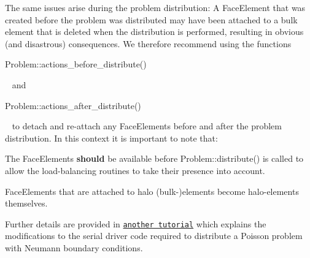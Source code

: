 The same issues arise during the problem distribution\+: A {\ttfamily Face\+Element} that was created before the problem was distributed may have been attached to a bulk element that is deleted when the distribution is performed, resulting in obvious (and disastrous) consequences. We therefore recommend using the functions ~\newline
~\newline

\begin{DoxyCode}
Problem::actions\_before\_distribute()
\end{DoxyCode}
 ~\newline
and ~\newline
~\newline

\begin{DoxyCode}
Problem::actions\_after\_distribute()
\end{DoxyCode}
 ~\newline
to detach and re-\/attach any {\ttfamily Face\+Elements} before and after the problem distribution. In this context it is important to note that\+: ~\newline

\begin{DoxyEnumerate}
\item The {\ttfamily Face\+Elements} {\bfseries should} be available before {\ttfamily Problem\+::distribute()} is called to allow the load-\/balancing routines to take their presence into account. ~\newline
~\newline

\item {\ttfamily Face\+Elements} that are attached to halo (bulk-\/)elements become halo-\/elements themselves.
\end{DoxyEnumerate}Further details are provided in \href{../../two_d_poisson_flux_bc_adapt/html/index.html}{\tt another tutorial} which explains the modifications to the serial driver code required to distribute a Poisson problem with Neumann boundary conditions.



